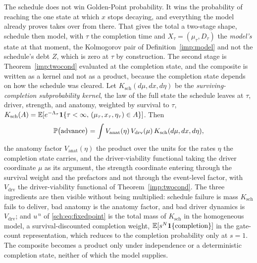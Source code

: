 The schedule does not win Golden-Point probability. It wins the
probability of reaching the one state at which $x$ stops decaying, and
everything the model already proves takes over from there. That gives
the total a two-stage shape, schedule then model, with $\tau$ the
completion time and $X_\tau=(\mu_\tau,D_\tau)$ the \emph{model's} state
at that moment, the Kolmogorov pair of Definition~\ref{imp:model}
and not the schedule's debt $Z$, which is zero at $\tau$ by
construction.\label{sch:eq:composite} The second stage is
Theorem~\ref{imp:twocond} evaluated at the completion state, and the
composite is written as a kernel and not as a product, because the
completion state depends on how the schedule was cleared. Let $K_{\mathrm{sch}}(d\mu,dx,d\eta)$ be the \emph{surviving-completion
subprobability kernel}, the law of the full state the schedule leaves
at $\tau$, driver, strength, and anatomy, weighted by survival to
$\tau$,
$K_{\mathrm{sch}}(A)=\mathbb{E}[e^{-\Lambda_\tau}\mathbf{1}\{\tau<\infty,\,(\mu_\tau,x_\tau,\eta_\tau)\in A\}]$.
Then
\begin{equation}\label{sch:eq:threecond}
\mathbb{P}\bigl(\text{advance}\bigr)
=\int V_{\mathrm{anat}}(\eta)\,V_{\mathrm{drv}}(\mu)\,K_{\mathrm{sch}}(d\mu,dx,d\eta),
\end{equation}
the anatomy factor $V_{\mathrm{anat}}(\eta)$ the product over the units for the rates $\eta$ the completion state carries, and the driver-viability functional taking the driver coordinate $\mu$ as
its argument, the strength coordinate entering through the survival
weight and the prefactors and not through the event-level factor,
with $V_{\mathrm{drv}}$ the driver-viability functional of
Theorem~\ref{imp:twocond}. The three ingredients are then visible without
being multiplied: schedule failure is mass $K_{\mathrm{sch}}$ fails to
deliver, bad anatomy is the anatomy factor, and bad driver dynamics is
$V_{\mathrm{drv}}$; and $u^{\,n}$ of \eqref{sch:eq:fixedpoint} is the
total mass of $K_{\mathrm{sch}}$ in the homogeneous model, a
survival-discounted completion weight, $\mathbb{E}[s^N\mathbf{1}\{\text{completion}\}]$
in the gate-count representation, which reduces to the completion
probability only at $s=1$. The composite becomes a product only under
independence or a deterministic completion state, neither of which the
model supplies.

